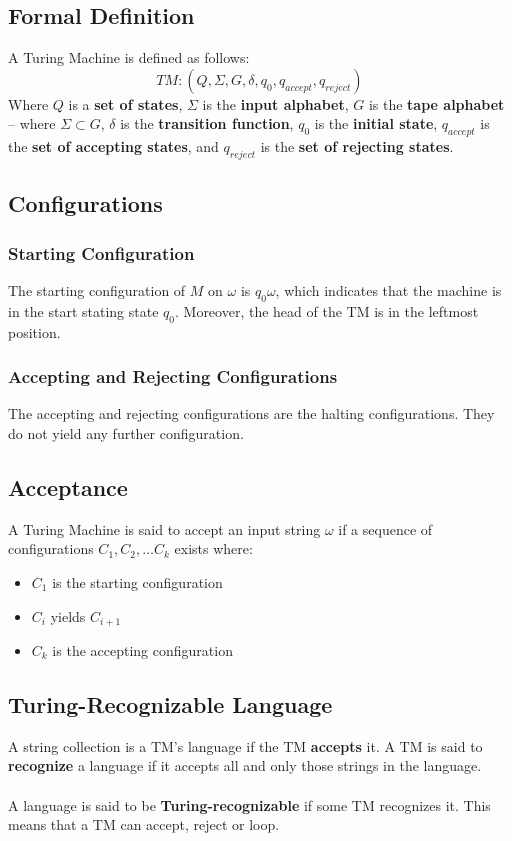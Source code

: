 \documentclass{article}
\begin{document}
\subsection{Formal Definition}
A Turing Machine is defined as follows:
\[ TM: (Q, \Sigma, G, \delta, q_0, q_{accept}, q_{reject}) \]
Where $Q$ is a \textbf{set of states}, $\Sigma$ is the \textbf{input alphabet}, $G$ is the \textbf{tape alphabet} -- where $\Sigma \subset G$, $\delta$ is the \textbf{transition function}, $q_0$ is the \textbf{initial state}, $q_{accept}$ is the \textbf{set of accepting states}, and $q_{reject}$ is the \textbf{set of rejecting states}.

\subsection{Configurations}
\subsubsection{Starting Configuration}
The starting configuration of $M$ on $\omega$ is $q_0 \omega$, which indicates that the machine is in the start stating state $q_0$. Moreover, the head of the TM is in the leftmost position.

\subsubsection{Accepting and Rejecting Configurations}
The accepting and rejecting configurations are the halting configurations. They do not yield any further configuration.

\subsection{Acceptance}
A Turing Machine is said to accept an input string $\omega$ if a sequence of configurations $C_1, C_2, \dots C_k$ exists where:

\begin{itemize}
	\item $C_1$ is the starting configuration
	\item $C_i$ yields $C_{i+1}$
	\item $C_k$ is the accepting configuration
\end{itemize}

\subsection{Turing-Recognizable Language}
A string collection is a TM's language if the TM \textbf{accepts} it. A TM is said to \textbf{recognize} a language if it accepts all and only those strings in the language. \\ \\
A language is said to be \textbf{Turing-recognizable} if some TM recognizes it. This means that a TM can accept, reject or loop.
\end{document}
